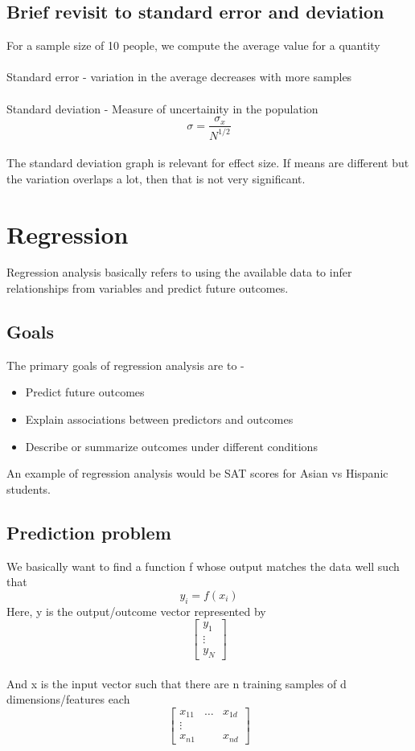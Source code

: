 \subsection{Brief revisit to standard error and deviation}
For a sample size of 10 people, we compute the average value for a quantity
\\
\\
Standard error - variation in the average decreases with more samples
\\
\\
Standard deviation - Measure of uncertainity in the population
\begin{equation*}
  \sigma = \frac{\sigma_x}{N^{1/2}} 
\end{equation*}
\\
The standard deviation graph is relevant for effect size. If means are different but the variation overlaps a lot, then that is not very significant.


\section{Regression}

Regression analysis basically refers to using the available data to infer relationships from variables and predict future outcomes.
\subsection{Goals}
The primary goals of regression analysis are to -
\begin{itemize}
    \item 
    Predict future outcomes
    \item Explain associations between predictors and outcomes
    \item
    Describe or summarize outcomes under different conditions
\end{itemize}
An example of regression analysis would be SAT scores for Asian vs Hispanic students.
\\
\subsection{Prediction problem}
We basically want to find a function f whose output matches the data well such that
\begin{equation*}
  y_i = f(x_i)
\end{equation*}
Here, y is the output/outcome vector represented by 
$$\begin{bmatrix} 
    y_{1} \\
    \vdots \\
    y_{N} 
\end{bmatrix}$$
\\
And x is the input vector such that there are n training samples of d dimensions/features each
$$\begin{bmatrix} 
    x_{11} & \dots & x_{1d} \\
    \vdots \\
    x_{n1} &        & x_{nd} 
\end{bmatrix}$$


